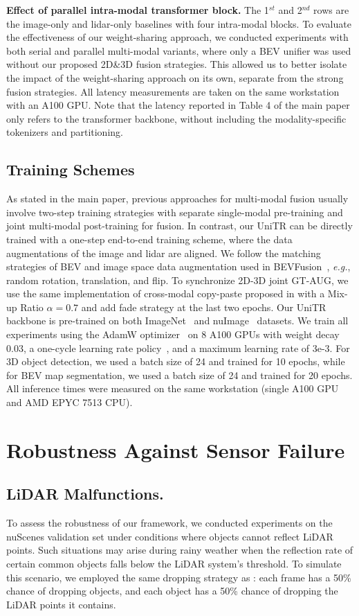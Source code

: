 \documentclass[10pt,twocolumn,letterpaper]{article}
\begin{document}
\noindent \textbf{Effect of parallel intra-modal transformer block.} The 1$^{st}$ and 2$^{nd}$ rows are the image-only and lidar-only baselines with four intra-modal blocks. To evaluate the effectiveness of our weight-sharing approach, we conducted experiments with both serial and parallel multi-modal variants, where only a BEV unifier was used without our proposed 2D\&3D fusion strategies. This allowed us to better isolate the impact of the weight-sharing approach on its own, separate from the strong fusion strategies. All latency measurements are taken on the same workstation with an A100 GPU. Note that the latency reported in Table {\color{red}4} of the main paper only refers to the transformer backbone, without including the modality-specific tokenizers and partitioning.
\subsection{Training Schemes} 
As stated in the main paper, previous approaches for multi-modal fusion usually involve two-step training strategies with separate single-modal pre-training and joint multi-modal post-training for fusion. In contrast, our UniTR can be directly trained with a one-step end-to-end training scheme, where the data augmentations of the image and lidar are aligned.  We follow the matching strategies of BEV and image space data augmentation used in BEVFusion~\cite{liu2022bevfusion}, \emph{e.g.}, random rotation, translation, and flip. To synchronize 2D-3D joint GT-AUG, we use the same implementation of cross-modal copy-paste proposed in \cite{chen2022autoalignv2} with a Mix-up Ratio $\alpha=0.7$ and add fade strategy at the last two epochs. Our UniTR backbone is pre-trained on both ImageNet~\cite{deng2009imagenet} and nuImage~\cite{caesar2020nuscenes} datasets.  We train all experiments using the AdamW optimizer~\cite{loshchilov2018decoupled} on 8 A100 GPUs with weight decay 0.03, a one-cycle learning rate policy~\cite{onecyc}, and a maximum learning rate of 3e-3. For 3D object detection, we used a batch size of 24 and trained for 10 epochs, while for BEV map segmentation, we used a batch size of 24 and trained for 20 epochs. All inference times were measured on the same workstation (single A100 GPU and AMD EPYC 7513 CPU).

\section{Robustness Against Sensor Failure} \label{sec:robust}
\subsection{LiDAR Malfunctions.} To assess the robustness of our framework, we conducted experiments on the nuScenes validation set under conditions where objects cannot reflect LiDAR points. Such situations may arise during rainy weather when the reflection rate of certain common objects falls below the LiDAR system's threshold. To simulate this scenario, we employed the same dropping strategy as \cite{liang2022bevfusion}: each frame has a 50\% chance of dropping objects, and each object has a 50\% chance of dropping the LiDAR points it contains.
\end{document}

